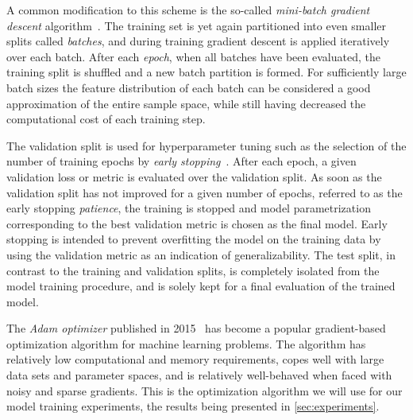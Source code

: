 A common modification to this scheme is the so-called \textit{mini-batch gradient descent} algorithm~\cite{gradient-descent}.
The training set is yet again partitioned into even smaller splits called \textit{batches}, and during training gradient descent is applied iteratively over each batch.
After each \textit{epoch}, when all batches have been evaluated, the training split is shuffled and a new batch partition is formed.
For sufficiently large batch sizes the feature distribution of each batch can be considered a good approximation of the entire sample space, while still having decreased the computational cost of each training step.

The validation split is used for hyperparameter tuning such as the selection of the number of training epochs by \textit{early stopping}~\cite{early-stopping}.
After each epoch, a given validation loss or metric is evaluated over the validation split.
As soon as the validation split has not improved for a given number of epochs, referred to as the early stopping \textit{patience}, the training is stopped and model parametrization corresponding to the best validation metric is chosen as the final model.
Early stopping is intended to prevent overfitting the model on the training data by using the validation metric as an indication of generalizability.
The test split, in contrast to the training and validation splits, is completely isolated from the model training procedure, and is solely kept for a final evaluation of the trained model.

The \textit{Adam optimizer} published in 2015~\cite{adam-optimizer} has become a popular gradient-based optimization algorithm for machine learning problems.
The algorithm has relatively low computational and memory requirements, copes well with large data sets and parameter spaces, and is relatively well-behaved when faced with noisy and sparse gradients.
This is the optimization algorithm we will use for our model training experiments, the results being presented in \cref{sec:experiments}.
